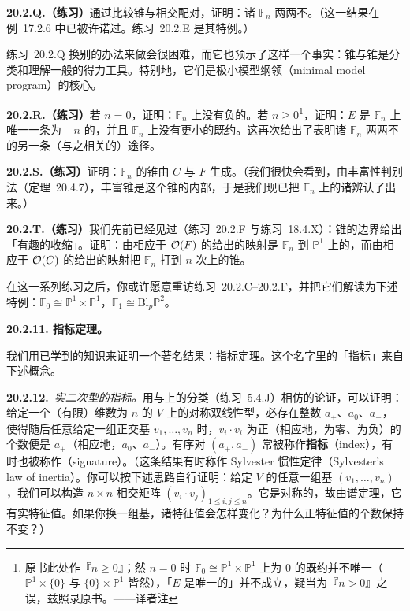 \textbf{20.2.Q.（练习）}\quad 通过比较\trEffective{}锥与相交配对，证明：诸 $\mathbb{F}_n$ 两两不\trIsomorphic。（这一结果在\mbox{例~17.2.6} 中已被许诺过。\mbox{练习~20.2.E} 是其特例。）

\mbox{练习~20.2.Q} 换别的办法来做会很困难，而它也预示了这样一个事实：\trNef{}锥与\trEffective{}锥是分类和理解一般\trVariety{}的得力工具。特别地，它们是极小模型纲领（minimal model program）的核心。

\textbf{20.2.R.（练习）}\quad 若 $n=0$，证明：$\mathbb{F}_n$ 上没有负\trSelfIntersection{}的\trCurve。若 $n\ge 0$\footnote{原书此处作『$n\ge 0$』；然 $n=0$ 时 $\mathbb{F}_0\cong\mathbb{P}^1\times\mathbb{P}^1$ 上\trSelfIntersection{}为 $0$ 的既约\trCurve{}并不唯一（$\mathbb{P}^1\times\{0\}$ 与 $\{0\}\times\mathbb{P}^1$ 皆然），「$E$ 是唯一的」并不成立，疑当为『$n>0$』之误，兹照录原书。——译者注}，证明：$E$ 是 $\mathbb{F}_n$ 上唯一一条\trSelfIntersection{}为 $-n$ 的\trCurve，并且 $\mathbb{F}_n$ 上没有\trSelfIntersection{}更小的既约\trCurve。这再次给出了表明诸 $\mathbb{F}_n$ 两两不\trIsomorphic{}的另一条（与之相关的）途径。

\textbf{20.2.S.（练习）}\quad 证明：$\mathbb{F}_n$ 的\trNef{}锥由 $C$ 与 $F$ 生成。（我们很快会看到，由\trKleiman{}丰富性判别法（\mbox{定理~20.4.7}），丰富锥是这个锥的内部，于是我们现已把 $\mathbb{F}_n$ 上的诸\trAmple\trLineBundle{}辨认了出来。）

\textbf{20.2.T.（练习）}\quad 我们先前已经见过（\mbox{练习~20.2.F} 与\mbox{练习~18.4.X}）：\trNef{}锥的边界给出「有趣的收缩」。证明：由相应于 $\mathcal{O}(F)$ 的\trLinearSystem{}给出的映射是 $\mathbb{F}_n$ 到 $\mathbb{P}^1$ 上的\trProjection，而由相应于 $\mathcal{O}(C)$ 的\trLinearSystem{}给出的映射把 $\mathbb{F}_n$ 打到 $n$ 次\trRationalNormalCurve{}上的\trProjective{}锥。

在这一系列练习之后，你或许愿意重访\mbox{练习~20.2.C--20.2.F}，并把它们解读为下述特例：$\mathbb{F}_0\cong\mathbb{P}^1\times\mathbb{P}^1$，$\mathbb{F}_1\cong\mathrm{Bl}_p\mathbb{P}^2$。

\textbf{20.2.11. \trHodge{}指标定理。}

我们用已学到的知识来证明一个著名结果：\trHodge{}指标定理。这个名字里的「指标」来自下述概念。

\textbf{20.2.12.}\ \emph{实二次型的指标。}\quad 用与\trAlgClosedField{}上\trQuadraticForm{}的分类（\mbox{练习~5.4.J}）相仿的论证，可以证明：给定一个（有限）维数为 $n$ 的\trReal\trVectorSpace{} $V$ 上的对称双线性型，必存在整数 $a_+$、$a_0$、$a_-$，使得随后任意给定一组正交基 $v_1,\dots,v_n$ 时，$v_i\cdot v_i$ 为正（相应地，为零、为负）的个数便是 $a_+$（相应地，$a_0$、$a_-$）。有序对 $(a_+,a_-)$ 常被称作\textbf{指标}（index），有时也被称作\textbf{\trSignature}（signature）。（这条结果有时称作 Sylvester 惯性定律（Sylvester's law of inertia）。你可以按下述思路自行证明：给定 $V$ 的任意一组基 $(v_1,\dots,v_n)$，我们可以构造 $n\times n$ 相交矩阵 $(v_i\cdot v_j)_{1\le i,j\le n}$。它是对称的，故由谱定理，它有实特征值。如果你换一组基，诸特征值会怎样变化？为什么正特征值的个数保持不变？）


